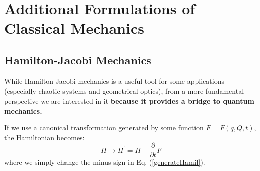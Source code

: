 \section{Additional Formulations of Classical Mechanics}
\subsection{Hamilton-Jacobi Mechanics}
While Hamilton-Jacobi mechanics is a useful tool for some applications (especially chaotic systems and geometrical optics), from a more fundamental perspective we are interested in it \textbf{because it provides a bridge to quantum mechanics.}

If we use a canonical transformation generated by some function $F=F(q,Q,t)$, the Hamiltonian becomes:
\begin{equation}
H \rightarrow H^{\prime}=H+\frac{\partial}{\partial t} F
\end{equation}
where we simply change the minus sign in Eq. (\ref{generateHamil}).

